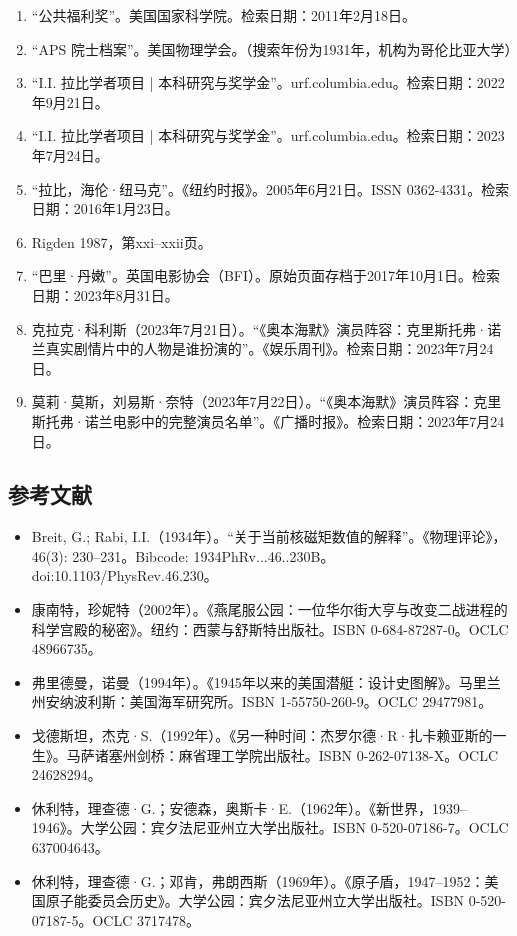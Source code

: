 \begin{enumerate}
\item “公共福利奖”。美国国家科学院。检索日期：2011年2月18日。
\item “APS 院士档案”。美国物理学会。（搜索年份为1931年，机构为哥伦比亚大学）
\item “I.I. 拉比学者项目 | 本科研究与奖学金”。urf.columbia.edu。检索日期：2022年9月21日。
\item “I.I. 拉比学者项目 | 本科研究与奖学金”。urf.columbia.edu。检索日期：2023年7月24日。
\item “拉比，海伦·纽马克”。《纽约时报》。2005年6月21日。ISSN 0362-4331。检索日期：2016年1月23日。
\item Rigden 1987，第xxi–xxii页。
\item “巴里·丹嫩”。英国电影协会（BFI）。原始页面存档于2017年10月1日。检索日期：2023年8月31日。
\item 克拉克·科利斯（2023年7月21日）。“《奥本海默》演员阵容：克里斯托弗·诺兰真实剧情片中的人物是谁扮演的”。《娱乐周刊》。检索日期：2023年7月24日。
\item 莫莉·莫斯，刘易斯·奈特（2023年7月22日）。“《奥本海默》演员阵容：克里斯托弗·诺兰电影中的完整演员名单”。《广播时报》。检索日期：2023年7月24日。
\end{enumerate}
\subsection{参考文献}
\begin{itemize}
\item Breit, G.; Rabi, I.I.（1934年）。“关于当前核磁矩数值的解释”。《物理评论》，46(3): 230–231。Bibcode: 1934PhRv...46..230B。doi:10.1103/PhysRev.46.230。
\item 康南特，珍妮特（2002年）。《燕尾服公园：一位华尔街大亨与改变二战进程的科学宫殿的秘密》。纽约：西蒙与舒斯特出版社。ISBN 0-684-87287-0。OCLC 48966735。
\item 弗里德曼，诺曼（1994年）。《1945年以来的美国潜艇：设计史图解》。马里兰州安纳波利斯：美国海军研究所。ISBN 1-55750-260-9。OCLC 29477981。
\item 戈德斯坦，杰克·S.（1992年）。《另一种时间：杰罗尔德·R·扎卡赖亚斯的一生》。马萨诸塞州剑桥：麻省理工学院出版社。ISBN 0-262-07138-X。OCLC 24628294。
\item 休利特，理查德·G.；安德森，奥斯卡·E.（1962年）。《新世界，1939–1946》。大学公园：宾夕法尼亚州立大学出版社。ISBN 0-520-07186-7。OCLC 637004643。
\item 休利特，理查德·G.；邓肯，弗朗西斯（1969年）。《原子盾，1947–1952：美国原子能委员会历史》。大学公园：宾夕法尼亚州立大学出版社。ISBN 0-520-07187-5。OCLC 3717478。

\end{itemize}